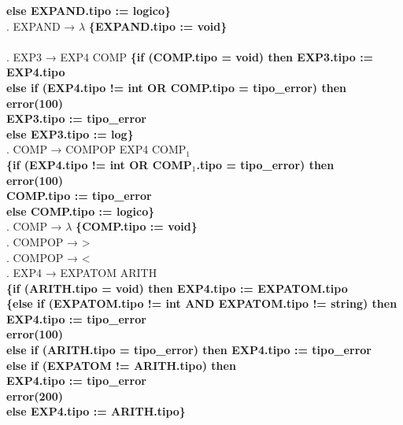 \begin{tabbing}
    \>                     \> \textbf{else EXPAND.tipo := logico\}}\\
    . EXPAND → $\lambda$ \textbf{\{EXPAND.tipo := void\}}\\
    \\
    . EXP3 → EXP4 COMP \>\textbf{\{if (COMP.tipo = void) then EXP3.tipo := EXP4.tipo}\\
    \>                     \> \textbf{else if (EXP4.tipo != int OR COMP.tipo = tipo\_error) then}\\
    \>                     \> \> \textbf{error(100)}\\
    \>                     \> \> \textbf{EXP3.tipo := tipo\_error}\\
    \>                     \> \textbf{else EXP3.tipo := log\}}\\
    . COMP → COMPOP EXP4 COMP$_1$\\
    \>                     \>\textbf{\{if (EXP4.tipo != int OR COMP$_1$.tipo = tipo\_error) then}\\
    \>                     \> \> \textbf{error(100)}\\
    \>                     \> \> \textbf{COMP.tipo := tipo\_error}\\
    \>                     \> \textbf{else COMP.tipo := logico\}}\\
    . COMP → $\lambda$ \textbf{\{COMP.tipo := void\}}\\
    . COMPOP → >\\
    . COMPOP → <\\
    . EXP4 → EXPATOM ARITH\\
    \>                     \>\textbf{\{if (ARITH.tipo = void) then EXP4.tipo := EXPATOM.tipo}\\
    \>                     \>\textbf{\{else if (EXPATOM.tipo != int AND EXPATOM.tipo != string) then}\\
    \> \> \> \textbf{EXP4.tipo := tipo\_error}\\
    \> \> \> \textbf{error(100)}\\
    \>                     \> \textbf{else if (ARITH.tipo = tipo\_error) then EXP4.tipo := tipo\_error}\\
    \>                     \> \textbf{else if (EXPATOM != ARITH.tipo) then}\\ 
    \> \> \> \textbf{EXP4.tipo := tipo\_error}\\
    \>                     \> \> \textbf{error(200)}\\
    \>                     \> \textbf{else EXP4.tipo := ARITH.tipo\}}\\

\end{tabbing}
